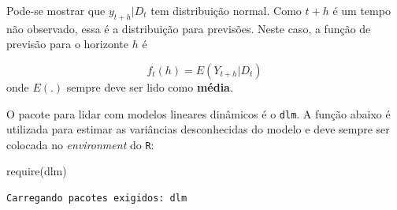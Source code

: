 \documentclass[
  letterpaper,
  DIV=11,
  numbers=noendperiod]{scrreprt}
\newenvironment{Shaded}{\begin{snugshade}}{\end{snugshade}}
\newcommand{\AttributeTok}[1]{\textcolor[rgb]{0.40,0.45,0.13}{#1}}
\newcommand{\CommentTok}[1]{\textcolor[rgb]{0.37,0.37,0.37}{#1}}
\newcommand{\ConstantTok}[1]{\textcolor[rgb]{0.56,0.35,0.01}{#1}}
\newcommand{\ControlFlowTok}[1]{\textcolor[rgb]{0.00,0.23,0.31}{\textbf{#1}}}
\newcommand{\DecValTok}[1]{\textcolor[rgb]{0.68,0.00,0.00}{#1}}
\newcommand{\FunctionTok}[1]{\textcolor[rgb]{0.28,0.35,0.67}{#1}}
\newcommand{\NormalTok}[1]{\textcolor[rgb]{0.00,0.23,0.31}{#1}}
\newcommand{\OtherTok}[1]{\textcolor[rgb]{0.00,0.23,0.31}{#1}}
\newcommand{\SpecialCharTok}[1]{\textcolor[rgb]{0.37,0.37,0.37}{#1}}
\begin{document}
Pode-se mostrar que \(y_{t+h}|D_t\) tem distribuição normal. Como
\(t+h\) é um tempo não observado, essa é a distribuição para previsões.
Neste caso, a função de previsão para o horizonte \(h\) é

\[f_t(h)=E(Y_{t+h}|D_{t})\] onde \(E(.)\) sempre deve ser lido como
\textbf{média}.

O pacote para lidar com modelos lineares dinâmicos é o \texttt{dlm}. A
função abaixo é utilizada para estimar as variâncias desconhecidas do
modelo e deve sempre ser colocada no \emph{environment} do \texttt{R}:

\begin{Shaded}
\begin{Highlighting}[]
\FunctionTok{require}\NormalTok{(dlm)}
\end{Highlighting}
\end{Shaded}

\begin{verbatim}
Carregando pacotes exigidos: dlm
\end{verbatim}

\begin{Shaded}
\end{Shaded}
\end{document}
